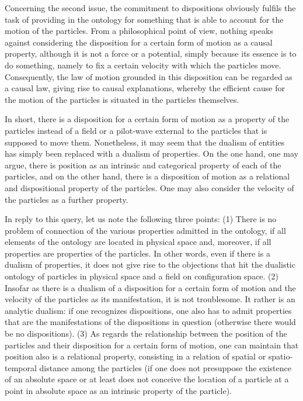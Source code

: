 \documentclass[12pt,a4paper]{article}
\theoremstyle{definition}
\begin{document}
Concerning the second issue, the commitment to dispositions obviously fulfils the task of providing in the ontology for something that is able to account for the motion of the particles. From a philosophical point of view, nothing speaks against considering the disposition for a certain form of motion as a causal property, although it is not a force or a potential, simply because its essence is to do something, namely to fix a certain velocity with which the particles move. Consequently, the law of motion grounded in this disposition can be regarded as a causal law, giving rise to causal explanations, whereby the efficient cause for the motion of the particles is situated in the particles themselves.

In short, there is a disposition for a certain form of motion as a property of the particles instead of a field or a pilot-wave external to the particles that is supposed to move them. Nonetheless, it may seem that the dualism of entities has simply been replaced with a dualism of properties. On the one hand, one may argue, there is position as an intrinsic and categorical property of each of the particles, and on the other hand, there is a disposition of motion as a relational and dispositional property of the particles. One may also consider the velocity of the particles as a further property.

In reply to this query, let us note the following three points: (1) There is no problem of connection of the various properties admitted in the ontology, if all elements of the ontology are located in physical space and, moreover, if all properties are properties of the particles. In other words, even if there is a dualism of properties, it does not give rise to the objections that hit the dualistic ontology of particles in physical space and a field on configuration space. (2) Insofar as there is a dualism of a disposition for a certain form of motion and the velocity of the particles as its manifestation, it is not troublesome. It rather is an analytic dualism: if one recognizes dispositions, one also has to admit properties that are the manifestations of the dispositions in question (otherwise there would be no dispositions). (3) As regards the relationship between the position of the particles and their disposition for a certain form of motion, one can maintain that position also is a relational property, consisting in a relation of spatial or spatio-temporal distance among the particles (if one does not presuppose the existence of an absolute space or at least does not conceive the location of a particle at a point in absolute space as an intrinsic property of the particle).
\end{document}
